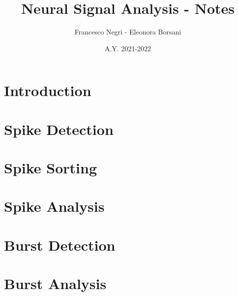 \documentclass[12pt]{article}
\title{Neural Signal Analysis - Notes}
\author{Francesco Negri - Eleonora Borsani}
\date{A.Y. 2021-2022}
\begin{document}
\maketitle

\tableofcontents
\newpage

\section{Introduction}
\graphicspath{ {./images/1/} }

\newpage

\section{Spike Detection}
\graphicspath{ {./images/2/} }

\newpage

\section{Spike Sorting}
\graphicspath{ {./images/3/} }

\newpage

\section{Spike Analysis}
\graphicspath{ {./images/4/} }

\newpage

\section{Burst Detection}
\graphicspath{ {./images/5/} }

\newpage

\section{Burst Analysis}
\graphicspath{ {./images/6/} }

\newpage
\end{document}

